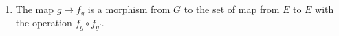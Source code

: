 \documentclass[a4paper,11pt]{exam}
\newcommand{\Z}{\mathbb{Z}}
\newcommand{\N}{\mathbb{N}}
\DeclareMathOperator{\pgcd}{pgcd}
\begin{document}
\begin{questions}
\begin{enumerate}
	\item The map $g \mapsto f_g$ is a morphism from $G$ to the set of map from $ E $ to $E$ with the operation $ f_g \circ f_{g'}$.
\end{enumerate}
%
%
%
%		
%			
%				
%		
%		
%			
%			
%			

\end{questions}
\end{document}
